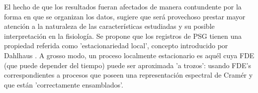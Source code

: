 El hecho de que los resultados fueran afectados de manera contundente por la forma en que se 
organizan los datos, sugiere que será provechoso prestar mayor atención a la naturaleza de las 
características estudiadas y su posible interpretación en la fisiología.
Se propone que los registros de PSG tienen una propiedad referida como 'estacionariedad local',
concepto introducido por Dahlhaus \cite{Dahlhaus97}.
A grosso modo, un proceso localmente estacionario es aquél cuya FDE (que puede depender del 
tiempo) puede ser aproximada 'a trozos': usando FDE's correspondientes a procesos que poseen una 
representación espectral de Cramér y que están 'correctamente ensamblados'.


